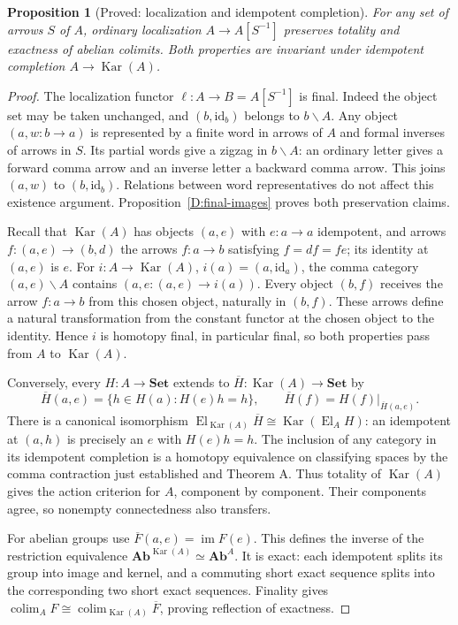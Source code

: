 \documentclass[11pt,a4paper]{article}
\newcommand{\Set}{\mathbf{Set}}
\newcommand{\Ab}{\mathbf{Ab}}
\newcommand{\El}{\operatorname{El}}
\newcommand{\colim}{\operatorname*{colim}}
\newcommand{\id}{\mathrm{id}}
\newcommand{\im}{\operatorname{im}}
\newcommand{\Kar}{\operatorname{Kar}}
\newtheorem{proposition}[theorem]{Proposition}
\theoremstyle{definition}
\begin{document}
\begin{proposition}[Proved: localization and idempotent completion]\label{D:localization-karoubi}
For any set of arrows $S$ of $A$, ordinary localization $A\to A[S^{-1}]$ preserves totality and exactness of abelian colimits. Both properties are invariant under idempotent completion $A\to\Kar(A)$.
\end{proposition}
\begin{proof}
The localization functor $\ell:A\to B=A[S^{-1}]$ is final. Indeed the object set may be taken unchanged, and $(b,\id_b)$ belongs to $b\backslash A$. Any object $(a,w:b\to a)$ is represented by a finite word in arrows of $A$ and formal inverses of arrows in $S$. Its partial words give a zigzag in $b\backslash A$: an ordinary letter gives a forward comma arrow and an inverse letter a backward comma arrow. This joins $(a,w)$ to $(b,\id_b)$. Relations between word representatives do not affect this existence argument. Proposition~\ref{D:final-images} proves both preservation claims.

Recall that $\Kar(A)$ has objects $(a,e)$ with $e:a\to a$ idempotent, and arrows $f:(a,e)\to(b,d)$ the arrows $f:a\to b$ satisfying $f=df=fe$; its identity at $(a,e)$ is $e$. For $i:A\to\Kar(A)$, $i(a)=(a,\id_a)$, the comma category $(a,e)\backslash A$ contains $(a,e:(a,e)\to i(a))$. Every object $(b,f)$ receives the arrow $f:a\to b$ from this chosen object, naturally in $(b,f)$. These arrows define a natural transformation from the constant functor at the chosen object to the identity. Hence $i$ is homotopy final, in particular final, so both properties pass from $A$ to $\Kar(A)$.

Conversely, every $H:A\to\Set$ extends to $\overline H:\Kar(A)\to\Set$ by
\[
 \overline H(a,e)=\{h\in H(a):H(e)h=h\},\qquad
 \overline H(f)=H(f)|_{\overline H(a,e)}.
\]
There is a canonical isomorphism $\El_{\Kar(A)}\overline H\cong\Kar(\El_AH)$: an idempotent at $(a,h)$ is precisely an $e$ with $H(e)h=h$. The inclusion of any category in its idempotent completion is a homotopy equivalence on classifying spaces by the comma contraction just established and Theorem A. Thus totality of $\Kar(A)$ gives the action criterion for $A$, component by component. Their components agree, so nonempty connectedness also transfers.

For abelian groups use $\overline F(a,e)=\im F(e)$. This defines the inverse of the restriction equivalence $\Ab^{\Kar(A)}\simeq\Ab^A$. It is exact: each idempotent splits its group into image and kernel, and a commuting short exact sequence splits into the corresponding two short exact sequences. Finality gives $\colim_AF\cong\colim_{\Kar(A)}\overline F$, proving reflection of exactness.
\end{proof}
\end{document}
